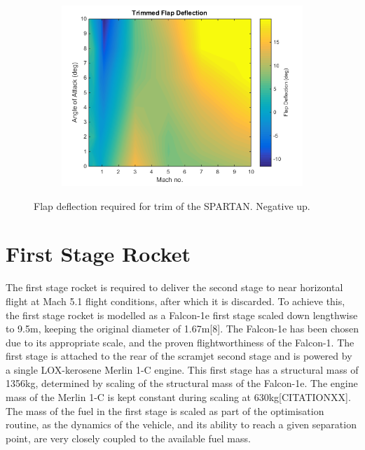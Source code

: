 \begin{figure}
\begin{subfigure}{.5\textwidth}
	\caption{}
	\label{fig:FlapDeflectionENgineOn2}
\end{subfigure}
\begin{subfigure}{.5\textwidth}
	\centering
	\includegraphics[width=0.99\linewidth]{figures/3_vehicle_design/FlapDeflection}
	\caption{}
	\label{fig:FlapDeflectionEngineOff}
\end{subfigure}
\label{fig:FlapDeflection}
\caption{Flap deflection required for trim of the SPARTAN. Negative up.}
\end{figure}


\section{First Stage Rocket}
The first stage rocket is required to deliver the second stage to near horizontal flight at Mach 5.1 flight conditions,
after which it is discarded. To achieve this, the first stage rocket is modelled as a Falcon-1e first stage scaled down
lengthwise to 9.5m, keeping the original diameter of 1.67m[8]. 
The Falcon-1e has been chosen due to its appropriate scale, and the proven flightworthiness of the Falcon-1. 
 The first stage is attached to the rear of the scramjet
second stage and is powered by a single LOX-kerosene Merlin 1-C engine. This first stage has a structural mass of
1356kg, determined by scaling of the structural mass of the Falcon-1e. The engine mass of the Merlin 1-C is kept constant during scaling at 630kg[CITATIONXX]. The mass of the
fuel in the first stage is scaled as part of the optimisation routine, as the dynamics of the vehicle, and its ability to reach a
given separation point, are very closely coupled to the available fuel mass.

